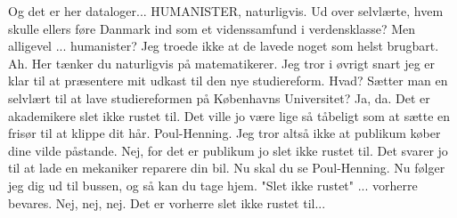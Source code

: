 \documentclass[a4paper,11pt]{article}
\begin{document}
\begin{sketch}
 Og det er her dataloger...
 HUMANISTER, naturligvis. Ud over selvlærte, hvem skulle ellers føre
	Danmark ind som et videnssamfund i verdensklasse?
   Men alligevel ... humanister? Jeg troede ikke at de lavede noget som
	helst brugbart.
 Ah. Her tænker du naturligvis på matematikerer. Jeg tror i øvrigt
	snart jeg er klar til at præsentere mit udkast til den nye
	studiereform.
 Hvad? Sætter man en selvlært til at lave studiereformen på
	Københavns Universitet?
 Ja, da. Det er akademikere slet ikke rustet til. Det ville jo være
	lige så tåbeligt som at sætte en frisør til at klippe dit hår.
 Poul-Henning. Jeg tror altså ikke at publikum køber dine vilde
	påstande.
 Nej, for det er publikum jo slet ikke rustet til. Det svarer jo til
	at lade en mekaniker reparere din bil.
 Nu skal du se Poul-Henning. Nu følger jeg dig ud til bussen, og så
	kan du tage hjem. "Slet ikke rustet" ... vorherre bevares.
 Nej, nej, nej. Det er vorherre slet ikke rustet til...


\end{sketch}
\end{document}
